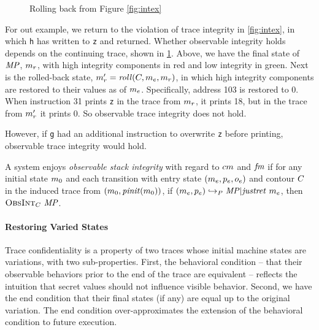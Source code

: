 \documentclass[acmsmall,review,anonymous]{acmart}\settopmatter{printfolios=true,printccs=false,printacmref=false}
\begin{document}
    \begin{figure}
      \integritylazyexample
      \caption{Rolling back from Figure \ref{fig:intex}}
      \label{fig:intlex}
    \end{figure}

    For out example, we return to the violation of trace integrity in
    \cref{fig:intex}, in which {\tt h} has written to {\tt z} and returned.
    Whether observable integrity holds depends on the continuing trace, shown
    in \cref{fig:intlex}. Above, we have the final state of \(\mathit{MP}\),
    \(m_r\), with high integrity components in red and low integrity in
    green. Next is the rolled-back state, \(m_r' =
    \mathit{roll}(C,m_e,m_r)\), in which high integrity
    components are restored to their values as of \(m_e\). Specifically,
    address 103 is restored to 0. When instruction 31 prints {\tt z} in the
    trace from \(m_r\), it prints 18, but in the trace from \(m_r'\)
    it prints 0. So observable trace integrity does not hold.

    However, if {\tt g} had an additional instruction to overwrite {\tt z}
    before printing, observable trace integrity would hold.


      A system enjoys {\em observable stack integrity} with regard to
      \(cm\) and \(\mathit{fm}\) if for any initial state \(m_0\) and
      each transition with entry state \((m_e,p_e,o_e)\)
      and contour \(C\) in the induced trace from
      \((m_0,\mathit{pinit}(m_0))\), if
      \((m_e,p_e) \hookrightarrow_P \mathit{MP} | \mathit{justret}\ m_e\),
      then \(\text{\sc ObsInt}_C ~ \mathit{MP}\).

    \paragraph{Restoring Varied States}

      Trace confidentiality is a property of two traces whose initial machine
      states are variations, with two sub-properties. First, the behavioral
      condition -- that their observable behaviors prior to the end of the
      trace are equivalent -- reflects the intuition that secret values should
      not influence visible behavior. Second, we have the end condition that
      their final states (if any) are equal up to the original variation. The
      end condition over-approximates the extension of the behavioral condition
      to future execution.
\end{document}
